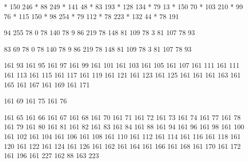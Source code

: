 * 150 246
*  88 249
* 141  48
*  83 193
* 128 134
*  79  13
* 150  70
* 103 210
*  99  76
* 115 150
*  98 254
*  79 112
*  78 223
* 132  44
*  78 191

 94 255
 78   0
 78 140
 78   9
 86 219
 78 148
 81 109
 78   3
 81 107
 78  93

 83  69
 78   0
 78 140
 78   9
 86 219
 78 148
 81 109
 78   3
 81 107
 78  93

\stopencoding


\startencoding[big5]

 161  93
 161  95
 161  97
 161  99
 161 101
 161 103
 161 105
 161 107
 161 111
 161 111
 161 113
 161 115
 161 117
 161 119
 161 121
 161 123
 161 125
 161 161
 161 163
 161 165
 161 167
 161 169
 161 171

 161  69
 161  75
 161  76

 161  65
 161  66
 161  67
 161  68
 161  70
 161  71
 161  72
 161  73
 161  74
 161  77
 161  78
 161  79
 161  80
 161  81
 161  82
 161  83
 161  84
 161  88
 161  94
 161  96
 161  98
 161 100
 161 102
 161 104
 161 106
 161 108
 161 110
 161 112
 161 114
 161 116
 161 118
 161 120
 161 122
 161 124
 161 126
 161 162
 161 164
 161 166
 161 168
 161 170
 161 172
 161 196
 161 227
 162  88
 163 223

